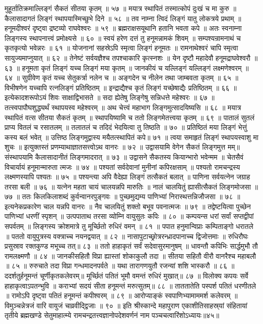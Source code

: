 मुहूर्तातिक्रमाल्लिङ्गं सैकतं सीतया कृतम् ॥ ५७ ॥
मयात्र स्थापितं तस्मात्कोपं दुःखं च मा कुरु ॥
कैलासादागतं लिङ्गं स्थापयास्मिच्छुभे दिने ॥ ५८ ॥
तव नाम्ना त्विदं लिङ्गं यातु लोकत्रये प्रथाम् ॥
हनूमदीश्वरं दृष्ट्वा द्रष्टव्यो राघवेश्वरः ॥ ५९ ॥
ब्रह्मराक्षसयूथानि हतानि भवता कपे ॥
अतः स्वनाम्ना लिङ्गस्य स्थापनात्त्वं प्रमोक्ष्यसे ॥ ६० ॥
स्वयं हरेण दत्तं तु हनूमन्नामकं शिवम् ॥
सम्पश्यन्रामनाथं च कृतकृत्यो भवेन्नरः ॥ ६१ ॥
योजनानां सहस्रेऽपि स्मृत्वा लिङ्गं हनूमतः ॥
रामनाथेश्वरं चापि स्मृत्वा सायुज्यमाप्नुयात् ॥ ६२ ॥
तेनेष्टं सर्वयज्ञैश्च तपश्चाकारि कृत्स्नशः ॥
येन दृष्टौ महादेवौ हनूमद्राघवेश्वरौ ॥ ६३ ॥
हनूमता कृतं लिङ्गं यच्च लिङ्गं मया कृतम् ॥
जानकीयं च यल्लिङ्गं यल्लिङ्गं लक्ष्मणेश्वरम् ॥ ६४ ॥
सुग्रीवेण कृतं यच्च सेतुकर्त्रा नलेन च ॥
अङ्गदेन च नीलेन तथा जाम्बवता कृतम् ॥ ६५ ॥
विभीषणेन यच्चापि रत्नलिङ्गं प्रतिष्ठितम् ॥
इन्द्राद्यैश्च कृतं लिङ्गं यच्छेषाद्यैः प्रतिष्ठितम् ॥ ६६ ॥
इत्येकादशरूपोऽयं शिवः साक्षाद्विभासते ॥
सदा ह्येतेषु लिङ्गेषु सन्निधत्ते महेश्वरः ॥ ६७ ॥
तत्स्वपापौघशुद्ध्यर्थं स्थापयस्व महेश्वरम् ॥
अथ चेत्त्वं महाभाग लिङ्गमुत्सादयिष्यसि ॥ ६८ ॥
मयात्र स्थापितं वत्स सीतया सैकतं कृतम् ॥
स्थापयिष्यामि च ततो लिङ्गमेतत्त्वया कृतम् ॥ ६९ ॥
पातालं सुतलं प्राप्य वितलं च रसातलम् ॥
तलातलं च तदिदं भेदयित्वा तु तिष्ठति ॥ ७० ॥
प्रतिष्ठितं मया लिङ्गं भेत्तुं कस्य बलं भवेत् ॥
उत्तिष्ठ लिङ्गमुद्वास्य मयैतत्स्थापितं कपे॥ ७१ ॥
त्वया समाहृतं लिङ्गं स्थापयस्वाशु मा शुचः ॥
इत्युक्तस्तं प्रणम्याथाज्ञातसत्त्वोऽथ वानरः ॥ ७२ ॥
उद्वासयामि वेगेन सैकतं लिङ्गमुत्त मम्॥
संस्थापयामि कैलासादानीतं लिङ्गमादरात् ॥ ७३ ॥
उद्वासने सैकतस्य कियान्भारो भवेन्मम ॥
चेतसैवं विचार्यायं हनूमान्मारुता त्मजः ॥ ७४ ॥
पश्यतां सर्वदेवानां मुनीनां कपिरक्षसाम् ॥
पश्यतो रामचन्द्रस्य लक्ष्मणस्यापि पश्यतः ॥ ७५ ॥
पश्यन्त्या अपि वैदेह्या लिङ्गं तत्सैकतं बलात् ॥
पाणिना सर्वयत्नेन जग्राह तरसा बली ॥ ७६ ॥
यत्नेन महता चायं चालयन्नपि मारुतिः ॥
नालं चालयितुं ह्यासीत्सैकतं लिङ्गमोजसा ॥ ७७ ॥
ततः किलकिलाशब्दं कुर्वन्वानरपुङ्गवः ॥
पुच्छमुद्यम्य पाणिभ्यां निरास्थत्तन्निजौजसा ॥ ७८ ॥
इत्यनेकप्रकारेण चाल यन्नपि वानरः ॥
नैव चालयितुं शक्तो बभूव पवनात्मजः ॥ ७९ ॥
तद्वेष्टयित्वा पुच्छेन पाणिभ्यां धरणीं स्पृशन् ॥
उत्पपाताथ तरसा व्योम्नि वायुसुतः कपिः ॥ ८० ॥
कम्पयन्स धरां सर्वां सप्तद्वीपां सपर्वतम् ॥
लिङ्गस्य क्रोशमात्रे तु मूर्च्छितो रुधिरं वमन् ॥ ८१ ॥
पपात हनुमान्विप्राः कम्पिताङ्गो धरातले ॥
पततो वायुपुत्रस्य वक्त्राच्च नयनद्वयात् ॥ ८२ ॥
नासापुटाच्छ्रोत्ररन्ध्रादपानाच्च द्विजोत्तमाः ॥
रुधिरौघः प्रसुस्राव रक्तकुण्ड मभूच्च तत्॥ ८३ ॥
ततो हाहाकृतं सर्वं सदेवासुरमानुषम् ॥
धावन्तौ कपिभिः सार्द्धमुभौ तौ रामलक्ष्मणौ ॥ ८४ ॥
जानकीसहितौ विप्रा ह्यास्तां शोकाकुलौ तदा ॥
सीतया सहितौ वीरौ वानरैश्च महाबलौ ॥ ८५ ॥
रुरुचाते तदा विप्रा गन्धमादनपर्वते ॥
यथा तारागणयुतौ रजन्यां शशि भास्करौ ॥ ८६ ॥
ददर्शतुर्हनूमन्तं चूर्णीकृतकलेवरम्॥
मूर्च्छितं पतितं भूमौ वमन्तं रुधिरं मुखात्॥ ८७ ॥
विलोक्य कपयः सर्वे हाहाकृत्वाऽपतन्भुवि ॥
कराभ्यां सदयं सीता हनूमन्तं मरुत्सुतम्॥ ८८ ॥
ताततातेति पस्पर्श पतितं धरणीतले ॥
रामोऽपि दृष्ट्वा पतितं हनूमन्तं कपीश्वरम् ॥ ८९ ॥
आरोप्याङ्कं स्वपाणिभ्यामाममर्श कलेवरम् ॥
विमुञ्चन्नेत्रजं वारि वायुजं चाव्रवीद्द्विजाः ॥ ९० ॥
इति श्रीस्कान्दे महापुराण एकाशीतिसाहस्र्यां संहितायां तृतीये ब्रह्मखण्डे सेतुमाहात्म्ये रामचन्द्रतत्त्वज्ञानोपदेशवर्णनं नाम पञ्चचत्वारिंशोऽध्यायः॥४५॥


